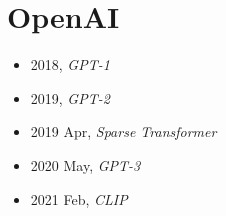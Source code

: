 \section{OpenAI}\label{com:OpenAI}

\begin{itemize}
    \item 2018, \textit{GPT-1}\cite{GPT-1}
    \item 2019, \textit{GPT-2}\cite{GPT-2}
    \item 2019 Apr, \textit{Sparse Transformer}\cite{Spare-Transformer}
    \item 2020 May, \textit{GPT-3}\cite{GPT-3}
    \item 2021 Feb, \textit{CLIP}\cite{CLIP}
\end{itemize}